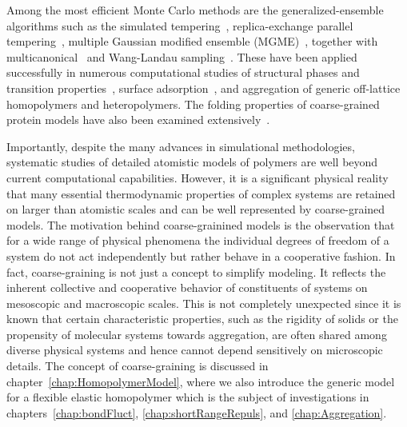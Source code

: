 \documentclass[12pt]{report}
\begin{document}
%
Among the most efficient Monte Carlo methods are the generalized-ensemble algorithms such as the simulated tempering~\cite{marinari,lyubartsev}, replica-exchange parallel tempering~\cite{sw1,geyer1,huku1,huku2}, multiple Gaussian modified ensemble (MGME)~\cite{Neuhaus2006}, together with multicanonical~\cite{muca1a,muca1b,muca2,muca3,muca4,Bachmann2013} and Wang-Landau sampling~\cite{wl1,wl2,wl3}. These have been applied successfully in numerous computational studies of structural phases and transition properties~\cite{Schnabel2009,bf1,bf2,grass2,vbj1,strauch1,svbj1, taylorRange1, taylorRange2,seaton3,semisslb1,Koci2015}, surface adsorption~\cite{bj4,prellberg1,paul1,mbj1,liang1,allen1,vb1,ywli1, mjb4,vgb1},
and aggregation\cite{KociAgg2015,jbj1,Junghans2008,Junghans2009,Junghans2011, Zieren2014,Zieren2015} of generic off-lattice homopolymers and heteropolymers. The folding properties of coarse-grained protein models have also been examined extensively~\cite{dill1,still1,still2,som1,hsu1,bj1,ssbj1}. 
%

%
Importantly, despite the many advances in simulational methodologies, systematic studies of detailed atomistic models of polymers are well beyond current computational capabilities. However, it is a significant physical reality that many essential thermodynamic properties of complex systems are retained on larger than atomistic scales and can be well represented by coarse-grained models. The motivation behind coarse-grainined models is the observation that for a wide range of physical phenomena the individual degrees of freedom of a system do not act independently but rather behave in a cooperative fashion. In fact, coarse-graining is not just a concept to simplify modeling. It reflects the inherent collective and cooperative behavior of constituents of systems on mesoscopic and macroscopic scales. This is not completely unexpected since it is known that certain characteristic properties, such as the rigidity of solids or the propensity of molecular systems towards aggregation, are often shared among diverse physical systems and hence cannot depend sensitively on microscopic details. The concept of coarse-graining is discussed in chapter~\ref{chap:HomopolymerModel}, where we also introduce the generic model for a flexible elastic homopolymer which is the subject of investigations in chapters~\ref{chap:bondFluct}, \ref{chap:shortRangeRepuls}, and \ref{chap:Aggregation}.
%
\end{document}

